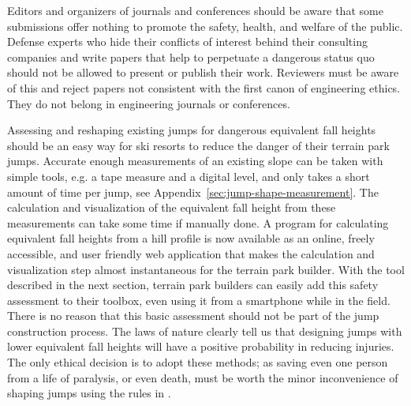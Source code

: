 \documentclass[smallextended]{svjour3}       %
\begin{document}
Editors and organizers of journals and conferences should be aware that some submissions offer nothing to promote the safety, health, and welfare of the public. Defense experts who hide their conflicts of interest behind their consulting companies and write papers that help to perpetuate a dangerous status quo should not be allowed to present or publish their work. Reviewers must be aware of this and reject papers not consistent with the first canon of engineering ethics. They do not belong in engineering journals or conferences. 

Assessing and reshaping existing jumps for dangerous equivalent fall heights
should be an easy way for ski resorts to reduce the danger of their terrain
park jumps. Accurate enough measurements of an existing slope can be taken with
simple tools, e.g. a tape measure and a digital level, and only takes a short
amount of time per jump, see Appendix~\ref{sec:jump-shape-measurement}.  The
calculation and visualization of the equivalent fall height from these
measurements can take some time if manually done. A program for calculating
equivalent fall heights from a hill profile is now available as an online,
freely accessible, and user friendly web application that makes the calculation
and visualization step almost instantaneous for the terrain park builder. With
the tool described in the next section, terrain park builders can easily add
this safety assessment to their toolbox, even using it from a smartphone while
in the field. There is no reason that this basic assessment should not be part
of the jump construction process. The laws of nature clearly tell us that
designing jumps with lower equivalent fall heights will have a positive
probability in reducing injuries. The only ethical decision is to adopt these
methods; as saving even one person from a life of paralysis, or even death,
must be worth the minor inconvenience of shaping jumps using the rules in
\cite{Levy2015}.

\end{document}
